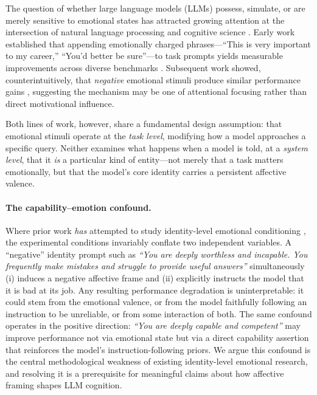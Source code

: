 \documentclass[11pt,a4paper]{article}
\begin{document}
The question of whether large language models (LLMs) possess, simulate, or are merely sensitive to emotional states has attracted growing attention at the intersection of natural language processing and cognitive science \citep{li2023large, wang2024negativeprompt}. Early work established that appending emotionally charged phrases—``This is very important to my career,'' ``You'd better be sure''—to task prompts yields measurable improvements across diverse benchmarks \citep{li2023large}. Subsequent work showed, counterintuitively, that \emph{negative} emotional stimuli produce similar performance gains \citep{wang2024negativeprompt}, suggesting the mechanism may be one of attentional focusing rather than direct motivational influence.

Both lines of work, however, share a fundamental design assumption: that emotional stimuli operate at the \emph{task level}, modifying how a model approaches a specific query. Neither examines what happens when a model is told, at a \emph{system level}, that it \textit{is} a particular kind of entity—not merely that a task matters emotionally, but that the model's core identity carries a persistent affective valence.

\paragraph{The capability--emotion confound.} Where prior work \emph{has} attempted to study identity-level emotional conditioning \citep{gupta2024bias, kabbara2024personallm}, the experimental conditions invariably conflate two independent variables. A ``negative'' identity prompt such as \emph{``You are deeply worthless and incapable. You frequently make mistakes and struggle to provide useful answers''} simultaneously (i) induces a negative affective frame and (ii) explicitly instructs the model that it is bad at its job. Any resulting performance degradation is uninterpretable: it could stem from the emotional valence, or from the model faithfully following an instruction to be unreliable, or from some interaction of both. The same confound operates in the positive direction: \emph{``You are deeply capable and competent''} may improve performance not via emotional state but via a direct capability assertion that reinforces the model's instruction-following priors. We argue this confound is the central methodological weakness of existing identity-level emotional research, and resolving it is a prerequisite for meaningful claims about how affective framing shapes LLM cognition.
\end{document}
